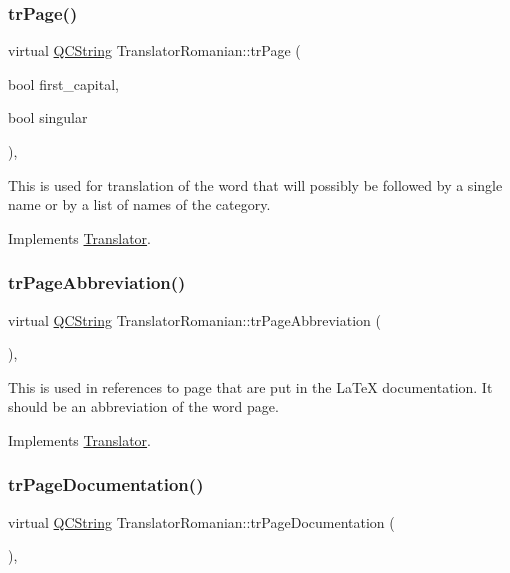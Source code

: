 \subsubsection{\texorpdfstring{trPage()}{trPage()}}
{\footnotesize\ttfamily virtual \mbox{\hyperlink{class_q_c_string}{Q\+C\+String}} Translator\+Romanian\+::tr\+Page (\begin{DoxyParamCaption}\item[{bool}]{first\+\_\+capital,  }\item[{bool}]{singular }\end{DoxyParamCaption})\hspace{0.3cm}{\ttfamily [inline]}, {\ttfamily [virtual]}}

This is used for translation of the word that will possibly be followed by a single name or by a list of names of the category. 

Implements \mbox{\hyperlink{class_translator}{Translator}}.

\mbox{\label{class_translator_romanian_adf8559ad6b2e2bb4ebca0746a371c499}} 
\subsubsection{\texorpdfstring{trPageAbbreviation()}{trPageAbbreviation()}}
{\footnotesize\ttfamily virtual \mbox{\hyperlink{class_q_c_string}{Q\+C\+String}} Translator\+Romanian\+::tr\+Page\+Abbreviation (\begin{DoxyParamCaption}{ }\end{DoxyParamCaption})\hspace{0.3cm}{\ttfamily [inline]}, {\ttfamily [virtual]}}

This is used in references to page that are put in the La\+TeX documentation. It should be an abbreviation of the word page. 

Implements \mbox{\hyperlink{class_translator}{Translator}}.

\mbox{\label{class_translator_romanian_a567980e036e54950c4d2e90057ceb35e}} 
\subsubsection{\texorpdfstring{trPageDocumentation()}{trPageDocumentation()}}
{\footnotesize\ttfamily virtual \mbox{\hyperlink{class_q_c_string}{Q\+C\+String}} Translator\+Romanian\+::tr\+Page\+Documentation (\begin{DoxyParamCaption}{ }\end{DoxyParamCaption})\hspace{0.3cm}{\ttfamily [inline]}, {\ttfamily [virtual]}}

